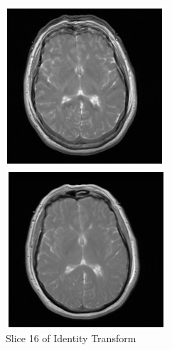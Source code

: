 \documentclass[11pt,english]{article}
\begin{document}
    \begin{figure}[h!]
        \centering
        \begin{minipage}[b]{0.2\textwidth}
          \includegraphics[width = \textwidth]{images/identityOverlap.PNG}
          \caption{Slice 16 of Identity Transform}
          \label{fig:identity}
        \end{minipage}
        \begin{minipage}[b]{0.2\textwidth}
          \includegraphics[width = \textwidth]{images/versorOverlap.PNG}

\end{minipage}
\end{figure}
\end{document}
